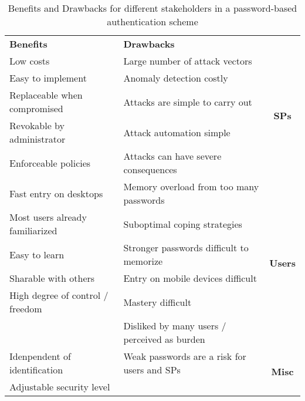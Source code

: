 \begin{table}[]
  \centering
  \caption{\label{table:rw:benefits_drawbacks_pws}Benefits and Drawbacks for different stakeholders in a password-based authentication scheme}
    \begin{tabular}{lr|c}
\cmidrule{1-2}    \textbf{Benefits} & \multicolumn{1}{l}{\textbf{Drawbacks}} &  \\
\cmidrule{1-2}    \rowcolor[rgb]{ .949,  .949,  .949} Low costs & \multicolumn{1}{l|}{Large number of attack vectors} & \multirow{5}[1]{*}{\begin{turn}{-90}\textbf{SPs}\end{turn}} \\
    \rowcolor[rgb]{ .949,  .949,  .949} Easy to implement & \multicolumn{1}{l|}{Anomaly detection costly} &  \\
    \rowcolor[rgb]{ .949,  .949,  .949} Replaceable when compromised & \multicolumn{1}{l|}{Attacks are simple to carry out} &  \\
    \rowcolor[rgb]{ .949,  .949,  .949} Revokable by administrator & \multicolumn{1}{l|}{Attack automation simple} &  \\
    \rowcolor[rgb]{ .949,  .949,  .949} Enforceable policies & \multicolumn{1}{l|}{Attacks can have severe consequences} &  \\
    \rowcolor[rgb]{ .886,  .937,  .855} Fast entry on desktops & \multicolumn{1}{l|}{Memory overload from too many passwords} & \multirow{6}[0]{*}{\begin{turn}{-90}\textbf{Users}\end{turn}} \\
    \rowcolor[rgb]{ .886,  .937,  .855} Most users already familiarized & \multicolumn{1}{l|}{Suboptimal coping strategies} &  \\
    \rowcolor[rgb]{ .886,  .937,  .855} Easy to learn & \multicolumn{1}{l|}{Stronger passwords difficult to memorize} &  \\
    \rowcolor[rgb]{ .886,  .937,  .855} Sharable with others & \multicolumn{1}{l|}{Entry on mobile devices difficult} &  \\
    \rowcolor[rgb]{ .886,  .937,  .855} High degree of control / freedom & \multicolumn{1}{l|}{Mastery difficult} &  \\
    \rowcolor[rgb]{ .886,  .937,  .855}       & \multicolumn{1}{l|}{Disliked by many users / perceived as burden} &  \\
    \rowcolor[rgb]{ .851,  .882,  .949} Idenpendent of identification & \multicolumn{1}{l|}{Weak passwords are a risk for users and SPs } & \multirow{2}[0]{*}{\begin{turn}{-90}\textbf{Misc}\end{turn}} \\
    \rowcolor[rgb]{ .851,  .882,  .949} Adjustable security level &       &  \\
    \end{tabular}%
  \label{tab:addlabel}%
\end{table}%
